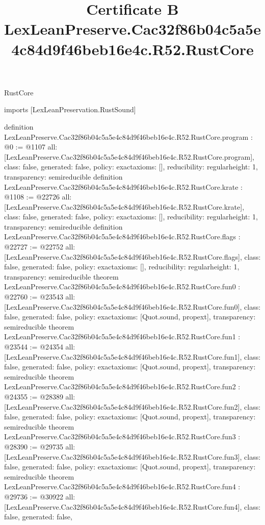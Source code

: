 \begin{lexlean}{RustCore}
\title{Certificate B LexLeanPreserve.Cac32f86b04c5a5e4c84d9f46beb16e4c.R52.RustCore}
\begin{coremodule}
imports [LexLeanPreservation.RustSound]

definition LexLeanPreserve.Cac32f86b04c5a5e4c84d9f46beb16e4c.R52.RustCore.program : @0 := @1107 {
  all: [LexLeanPreserve.Cac32f86b04c5a5e4c84d9f46beb16e4c.R52.RustCore.program],
  class: false,
  generated: false,
  policy: exact{axioms: []},
  reducibility: regular{height: 1},
  transparency: semireducible
}
definition LexLeanPreserve.Cac32f86b04c5a5e4c84d9f46beb16e4c.R52.RustCore.krate : @1108 := @22726 {
  all: [LexLeanPreserve.Cac32f86b04c5a5e4c84d9f46beb16e4c.R52.RustCore.krate],
  class: false,
  generated: false,
  policy: exact{axioms: []},
  reducibility: regular{height: 1},
  transparency: semireducible
}
definition LexLeanPreserve.Cac32f86b04c5a5e4c84d9f46beb16e4c.R52.RustCore.flags : @22727 := @22752 {
  all: [LexLeanPreserve.Cac32f86b04c5a5e4c84d9f46beb16e4c.R52.RustCore.flags],
  class: false,
  generated: false,
  policy: exact{axioms: []},
  reducibility: regular{height: 1},
  transparency: semireducible
}
theorem LexLeanPreserve.Cac32f86b04c5a5e4c84d9f46beb16e4c.R52.RustCore.fun0 : @22760 := @23543 {
  all: [LexLeanPreserve.Cac32f86b04c5a5e4c84d9f46beb16e4c.R52.RustCore.fun0],
  class: false,
  generated: false,
  policy: exact{axioms: [Quot.sound, propext]},
  transparency: semireducible
}
theorem LexLeanPreserve.Cac32f86b04c5a5e4c84d9f46beb16e4c.R52.RustCore.fun1 : @23544 := @24354 {
  all: [LexLeanPreserve.Cac32f86b04c5a5e4c84d9f46beb16e4c.R52.RustCore.fun1],
  class: false,
  generated: false,
  policy: exact{axioms: [Quot.sound, propext]},
  transparency: semireducible
}
theorem LexLeanPreserve.Cac32f86b04c5a5e4c84d9f46beb16e4c.R52.RustCore.fun2 : @24355 := @28389 {
  all: [LexLeanPreserve.Cac32f86b04c5a5e4c84d9f46beb16e4c.R52.RustCore.fun2],
  class: false,
  generated: false,
  policy: exact{axioms: [Quot.sound, propext]},
  transparency: semireducible
}
theorem LexLeanPreserve.Cac32f86b04c5a5e4c84d9f46beb16e4c.R52.RustCore.fun3 : @28390 := @29735 {
  all: [LexLeanPreserve.Cac32f86b04c5a5e4c84d9f46beb16e4c.R52.RustCore.fun3],
  class: false,
  generated: false,
  policy: exact{axioms: [Quot.sound, propext]},
  transparency: semireducible
}
theorem LexLeanPreserve.Cac32f86b04c5a5e4c84d9f46beb16e4c.R52.RustCore.fun4 : @29736 := @30922 {
  all: [LexLeanPreserve.Cac32f86b04c5a5e4c84d9f46beb16e4c.R52.RustCore.fun4],
  class: false,
  generated: false,
}
\end{coremodule}
\end{lexlean}
